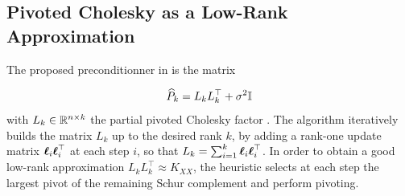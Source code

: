 \documentclass{article}
\begin{document}

\subsection{Pivoted Cholesky as a Low-Rank Approximation}

The proposed preconditionner in \cite{gardner_gpytorch_2021} is the matrix 

\begin{equation} \label{eq:precond}
    \widehat P_k = L_k L_k^\top + \sigma^2 \Id
\end{equation}
%
with $L_k \in \mathbb {\mathbb R}^{n \times k}$ the partial pivoted Cholesky factor \cite{harbrecht_low-rank_2012}. 
The algorithm iteratively builds the matrix $L_k$ up to the desired rank $k$, by adding a rank-one update matrix $\boldsymbol{\mathbf{\ell}}_i \boldsymbol{\mathbf{\ell}}_i^\top$ at each step $i$, so that $L_k = \sum_{i=1}^k \boldsymbol{\mathbf{\ell}}_i \boldsymbol{\mathbf{\ell}}_i^\top$. In order to obtain a good low-rank approximation $L_kL_k^\top \approx K_{XX}$, the heuristic selects at each step the largest pivot of the remaining Schur complement and perform pivoting. 
\end{document}
